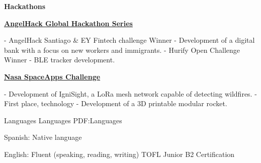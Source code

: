 \documentclass[letterpaper,yyyy,draft]{simpleresumecv}
\begin{document}
\begin{Body}
{    \Gap
    \Entry
    \textbf{Hackathons}
    {
        {
            \BulletItem
            \href{https://angelhack.com}{\textbf{AngelHack Global Hackathon Series}}
            \hfill
            \begin{Detail}
                \Gap
                 - AngelHack Santiago \& EY Fintech challenge Winner - \newline Development of a digital bank with a focus on new workers and immigrants.
                \Gap
                 - Hurify Open Challenge Winner - BLE tracker development.
            \end{Detail}
        }
        {
            \Gap
            \BulletItem
            \href{https://spaceappschallenge.org}{\textbf{Nasa SpaceApps Challenge}}
            \hfill
            \begin{Detail}
                \Gap
                 - Development of IgniSight, a LoRa mesh network capable of detecting wildfires.
                \Gap
                 - First place, technology - Development of a 3D printable modular rocket.
            \end{Detail}
        }
    }
}


\Section
{Languages}
{Languages}
{PDF:Languages}
{
    {
        \BulletItem
        Spanish: Native language
    }

    \Gap

    {
        \BulletItem
        English: Fluent (speaking, reading, writing)
        \SubBulletItem
        TOFL Junior B2 Certification
    }
}
\end{Body}
\end{document}
